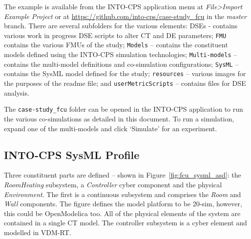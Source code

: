 The example is available from the INTO-CPS application menu at \emph{File>Import Example Project} or at \url{https://github.com/into-cps/case-study\_fcu} in the \emph{master} branch. There are several subfolders for the various elements: DSEs - contains various work in progress DSE scripts to alter CT and DE parameters; \texttt{FMU} contains the various FMUs of the study; \texttt{Models} -- contains the constituent models defined using the INTO-CPS simulation technologies; \texttt{Multi-models} -- contains the multi-model definitions and co-simulation configurations; \texttt{SysML} -- contains the SysML model defined for the study; \texttt{resources} -- various images for the purposes of the readme file; and \texttt{userMetricScripts} -- contains files for DSE analysis. 

The \texttt{case-study\_fcu} folder can be opened in the INTO-CPS application to run the various co-simulations as detailed in this document. To run a simulation, expand one of the multi-models and click `Simulate' for an experiment. 

%

\subsection{INTO-CPS SysML Profile}
\label{sec:fcu_into_sysml}

Three constituent parts are defined -- shown in Figure~\ref{fig:fcu_sysml_asd}:  the \emph{RoomHeating} subsystem, a \emph{Controller} cyber component and the physical \emph{Environment}. The first is a continuous subsystem and comprises the \emph{Room} and \emph{Wall} components.  The figure defines the model platform to be 20-sim, however, this could be OpenModelica too. All of the physical elements of the system are contained in a single CT model. The controller subsystem is a cyber element and modelled in VDM-RT.

